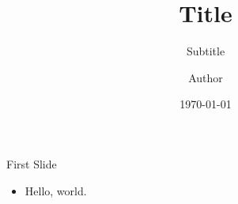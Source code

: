 \documentclass[10pt,aspectratio=169,xcolor=table]{beamer}
\title{Title}
\subtitle{Subtitle}
\author{Author}
\institute{Soundbendor Lab \textperiodcentered\ Oregon State University}
\date{\today}
\begin{document}
\maketitle

\begin{frame}{First Slide}
  \begin{itemize}
    \item Hello, world.
  \end{itemize}
\end{frame}
\end{document}
